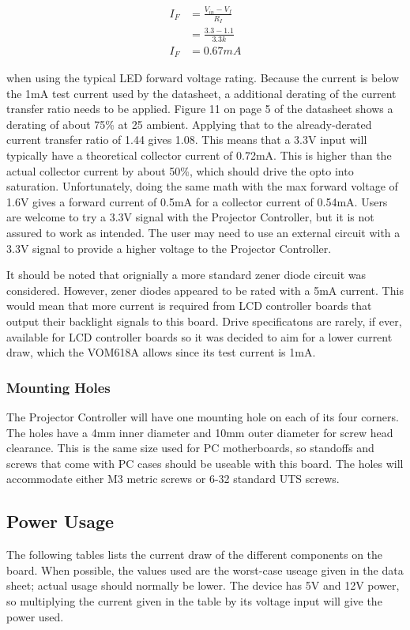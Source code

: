 \documentclass{article}
\begin{document}
\begin{align*}
    I_F &= \frac{V_{in} - V_f}{R_I} \\
    &= \frac{3.3 - 1.1}{3.3k} \\
    I_F &= 0.67mA
\end{align*}

when using the typical LED forward voltage rating.  Because the current is below the 1mA test
current used by the datasheet, a additional derating of the current transfer ratio needs to be
applied.  Figure 11 on page 5 of the datasheet shows a derating of about 75\% at 25\textcelsius{}
ambient.  Applying that to the already-derated current transfer ratio of 1.44 gives 1.08.  This means
that a 3.3V input will typically have a theoretical collector current of 0.72mA.  This is higher
than the actual collector current by about 50\%, which should drive the opto into saturation.
Unfortunately, doing the same math with the max forward voltage of 1.6V gives a forward current of
0.5mA for a collector current of 0.54mA.  Users are welcome to try a 3.3V signal with the Projector
Controller, but it is not assured to work as intended.  The user may need to use an external circuit
with a 3.3V signal to provide a higher voltage to the Projector Controller.

It should be noted that orignially a more standard zener diode circuit was considered.  However,
zener diodes appeared to be rated with a 5mA current.  This would mean that more current is required
from LCD controller boards that output their backlight signals to this board.  Drive specificatons
are rarely, if ever, available for LCD controller boards so it was decided to aim for a lower
current draw, which the VOM618A allows since its test current is 1mA.

\subsubsection{Mounting Holes} \label{sssec:MountingHoles}
The Projector Controller will have one mounting hole on each of its four corners.  The holes have a
4mm inner diameter and 10mm outer diameter for screw head clearance.  This is the same size used for
PC motherboards, so standoffs and screws that come with PC cases should be useable with this board.
The holes will accommodate either M3 metric screws or 6-32 standard UTS screws.


\subsection{Power Usage} \label{ssec:PowerUsage}
The following tables lists the current draw of the different components on the board.  When
possible, the values used are the worst-case useage given in the data sheet; actual usage should
normally be lower.  The device has 5V and 12V power, so multiplying the current given in the table
by its voltage input will give the power used.
\end{document}
